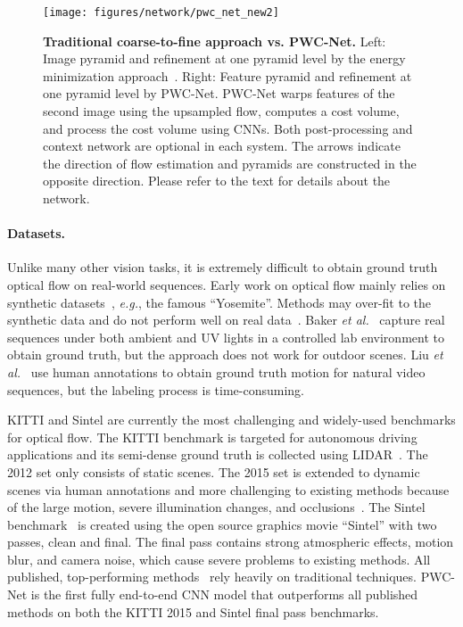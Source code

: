 \documentclass[10pt,journal,cspaper,compsoc]{IEEEtran}
\def\eg{\emph{e.g.}\xspace} \def\Eg{\emph{E.g.}\xspace}
\def\etal{\emph{et al.}\xspace}
\newcommand{\beforePara}{\vspace{-0em}}
\begin{document}
\begin{figure*}[t]
	\begin{center}		
		\newcommand{\shiftfigure}{\hspace{0\linewidth}}
		\texttt{[image: figures/network/pwc\_net\_new2]} 
	\end{center}
	\caption{{\bf Traditional coarse-to-fine approach vs. PWC-Net.} Left: Image pyramid and refinement at one pyramid level by the energy minimization approach~\cite{Black:1996:REMO,Brox:2004:HAO,Horn:1981:DO,Sun:IJCV:2014}.  Right: Feature pyramid and refinement at one pyramid level by PWC-Net. PWC-Net  warps features of the second image using the upsampled flow,  computes a cost volume, and process the cost volume using CNNs. Both post-processing and context network are optional in each system. The arrows indicate the direction of flow estimation and pyramids are constructed in the opposite direction.	Please refer to the text for details about the network. 
	}
	\label{fig:c2f:pwc}
\end{figure*}
	
	\beforePara
	\paragraph{Datasets.} 
	Unlike many other vision tasks, it is extremely difficult to obtain ground truth optical flow on real-world sequences. Early work on optical flow mainly relies on synthetic datasets~\cite{Barron:1994:PO}, \eg, the famous ``Yosemite''. Methods may over-fit to the synthetic data and do not perform well on real data~\cite{Liu:2008:HAMA}. Baker \etal~\cite{Baker:2011:DEO} capture real sequences under both ambient and UV lights in a controlled lab environment to obtain ground truth, but the approach does not work for outdoor scenes. Liu \etal~\cite{Liu:2008:HAMA} use human annotations to obtain ground truth motion for natural video sequences, but the labeling process is time-consuming. 
	
	KITTI and Sintel are currently the most challenging and widely-used benchmarks for optical flow. The KITTI benchmark is targeted for autonomous driving applications and its semi-dense ground truth is collected using LIDAR~\cite{Geiger:2012:KITTI}. The 2012 set only consists of static scenes.  The 2015 set is extended to dynamic scenes via human annotations and more challenging to existing methods because of the large motion, severe illumination changes, and occlusions~\cite{Menze2015CVPR}. 
	The Sintel benchmark~\cite{Butler:ECCV:2012} is created using the open source graphics movie ``Sintel'' with two passes, clean and final. The final pass contains strong atmospheric effects, motion blur,  and camera noise, which cause severe problems to existing methods.  
	All published, top-performing methods~\cite{Bailer_2017_CVPR,Wulff2017Optical,Xu2017Accurate}  rely heavily on traditional techniques. 
	PWC-Net is the first fully end-to-end CNN model that outperforms all published methods on both the KITTI 2015 and Sintel final pass benchmarks. 
\end{document}
